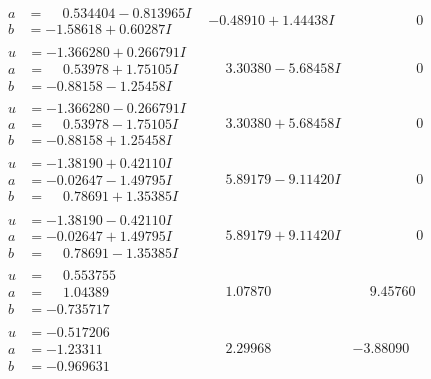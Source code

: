 \documentclass[1p]{elsarticle_modified}
\theoremstyle{definition}
\begin{document}
$$\begin{array}{c|c|c}
\begin{aligned}
a &= \phantom{-}0.534404 - 0.813965 I \\
b &= -1.58618 + 0.60287 I\end{aligned}
 & -0.48910 + 1.44438 I & \phantom{-0.000000 } 0 \\ \hline\begin{aligned}
u &= -1.366280 + 0.266791 I \\
a &= \phantom{-}0.53978 + 1.75105 I \\
b &= -0.88158 - 1.25458 I\end{aligned}
 & \phantom{-}3.30380 - 5.68458 I & \phantom{-0.000000 } 0 \\ \hline\begin{aligned}
u &= -1.366280 - 0.266791 I \\
a &= \phantom{-}0.53978 - 1.75105 I \\
b &= -0.88158 + 1.25458 I\end{aligned}
 & \phantom{-}3.30380 + 5.68458 I & \phantom{-0.000000 } 0 \\ \hline\begin{aligned}
u &= -1.38190 + 0.42110 I \\
a &= -0.02647 - 1.49795 I \\
b &= \phantom{-}0.78691 + 1.35385 I\end{aligned}
 & \phantom{-}5.89179 - 9.11420 I & \phantom{-0.000000 } 0 \\ \hline\begin{aligned}
u &= -1.38190 - 0.42110 I \\
a &= -0.02647 + 1.49795 I \\
b &= \phantom{-}0.78691 - 1.35385 I\end{aligned}
 & \phantom{-}5.89179 + 9.11420 I & \phantom{-0.000000 } 0 \\ \hline\begin{aligned}
u &= \phantom{-}0.553755\phantom{ +0.000000I} \\
a &= \phantom{-}1.04389\phantom{ +0.000000I} \\
b &= -0.735717\phantom{ +0.000000I}\end{aligned}
 & \phantom{-}1.07870\phantom{ +0.000000I} & \phantom{-}9.45760\phantom{ +0.000000I} \\ \hline\begin{aligned}
u &= -0.517206\phantom{ +0.000000I} \\
a &= -1.23311\phantom{ +0.000000I} \\
b &= -0.969631\phantom{ +0.000000I}\end{aligned}
 & \phantom{-}2.29968\phantom{ +0.000000I} & -3.88090\phantom{ +0.000000I}\\

\end{array}$$
\end{document}
